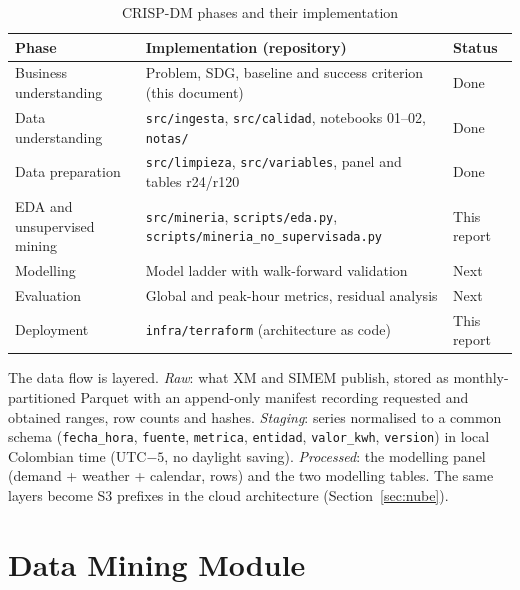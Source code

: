 \documentclass[conference,10pt]{IEEEtran}
\begin{document}
\begin{table}[!t]
\caption{CRISP-DM phases and their implementation}\label{tab:crisp}
\centering\footnotesize
\begin{tabularx}{\columnwidth}{@{}p{2.1cm}Xl@{}}
\toprule
Phase & Implementation (repository) & Status \\
\midrule
Business understanding & Problem, SDG, baseline and success criterion (this document) & Done \\
Data understanding & \texttt{src/ingesta}, \texttt{src/calidad}, notebooks 01--02, \texttt{notas/} & Done \\
Data preparation & \texttt{src/limpieza}, \texttt{src/variables}, panel and tables r24/r120 & Done \\
EDA and unsupervised mining & \texttt{src/mineria}, \texttt{scripts/eda.py}, \texttt{scripts/mineria\_no\_\allowbreak{}supervisada.py} & This report \\
Modelling & Model ladder with walk-forward validation & Next \\
Evaluation & Global and peak-hour metrics, residual analysis & Next \\
Deployment & \texttt{infra/terraform} (architecture as code) & This report \\
\bottomrule
\end{tabularx}
\end{table}

The data flow is layered. \emph{Raw}: what XM and SIMEM publish, stored as monthly-partitioned Parquet with an append-only manifest recording requested and obtained ranges, row counts and hashes. \emph{Staging}: series normalised to a common schema (\texttt{fecha\_hora}, \texttt{fuente}, \texttt{metrica}, \texttt{entidad}, \texttt{valor\_kwh}, \texttt{version}) in local Colombian time (UTC$-5$, no daylight saving). \emph{Processed}: the modelling panel (demand + weather + calendar, \panelFilas{} rows) and the two modelling tables. The same layers become S3 prefixes in the cloud architecture (Section~\ref{sec:nube}).

\section{Data Mining Module}\label{sec:mineria}
\end{document}
